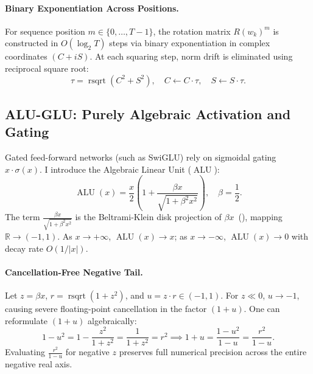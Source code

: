\documentclass[11pt,a4paper]{article}
\theoremstyle{definition}
\newcommand{\rsqrt}{\operatorname{rsqrt}}
\begin{document}
\paragraph{Binary Exponentiation Across Positions.}
For sequence position $m \in \{0, \dots, T-1\}$, the rotation matrix $R(w_k)^m$ is constructed in $O(\log_2 T)$ steps via binary exponentiation in complex coordinates $(C + i S)$. At each squaring step, norm drift is eliminated using reciprocal square root:
\begin{equation}
\tau = \rsqrt\left(C^2 + S^2\right), \quad C \leftarrow C \cdot \tau, \quad S \leftarrow S \cdot \tau.
\end{equation}

\subsection{ALU-GLU: Purely Algebraic Activation and Gating}
\label{subsec:alu}

Gated feed-forward networks (such as SwiGLU) rely on sigmoidal gating $x \cdot \sigma(x)$. I introduce the Algebraic Linear Unit ($\operatorname{ALU}$):
\begin{equation}
\label{eq:alu_def}
\operatorname{ALU}(x) = \frac{x}{2}\left(1 + \frac{\beta x}{\sqrt{1 + \beta^2 x^2}}\right), \quad \beta = \frac{1}{2}.
\end{equation}
The term $\frac{\beta x}{\sqrt{1 + \beta^2 x^2}}$ is the Beltrami-Klein disk projection of $\beta x$~(), mapping $\mathbb{R} \to (-1, 1)$. As $x \to +\infty$, $\operatorname{ALU}(x) \to x$; as $x \to -\infty$, $\operatorname{ALU}(x) \to 0$ with decay rate $O(1/|x|)$.

\paragraph{Cancellation-Free Negative Tail.}
Let $z = \beta x$, $r = \rsqrt(1 + z^2)$, and $u = z \cdot r \in (-1, 1)$. For $z \ll 0$, $u \to -1$, causing severe floating-point cancellation in the factor $(1 + u)$. One can reformulate $(1+u)$ algebraically:
\begin{equation}
1 - u^2 = 1 - \frac{z^2}{1 + z^2} = \frac{1}{1 + z^2} = r^2 \implies 1 + u = \frac{1 - u^2}{1 - u} = \frac{r^2}{1 - u}.
\end{equation}
Evaluating $\frac{r^2}{1 - u}$ for negative $z$ preserves full numerical precision across the entire negative real axis.
\end{document}
